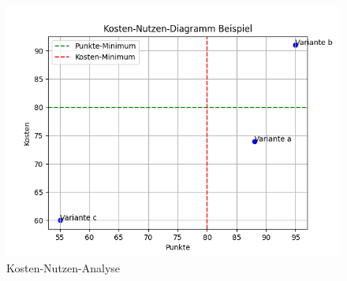 
\begin{flushleft}
    \begin{figure}[H]
        \centering
        \includegraphics[width=1\linewidth]{source/cost_benefit_diagram/cost_benefit_diagram}
        \caption{Kosten-Nutzen-Analyse}
        \label{fig:cost_benefit_diagram}
    \end{figure}
\end{flushleft}